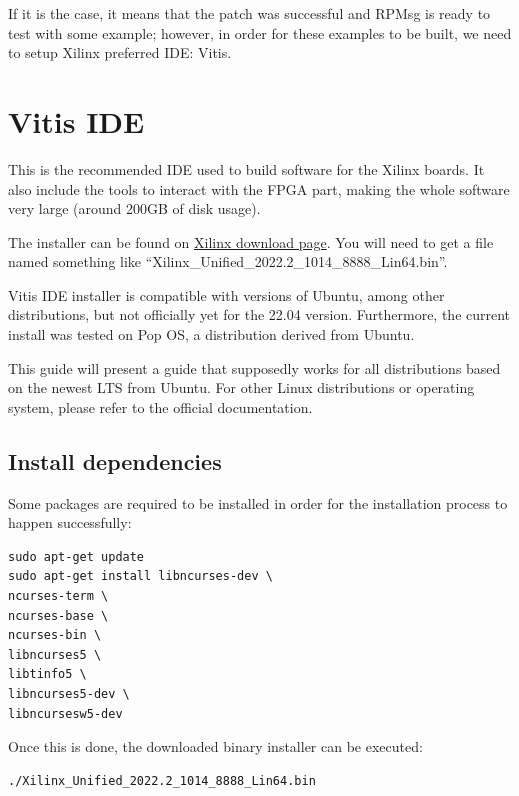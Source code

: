 \documentclass[10pt]{article}
\begin{document}
If it is the case, it means that the patch was successful and RPMsg is
ready to test with some example; however, in order for these examples
to be built, we need to setup Xilinx preferred IDE: Vitis.



\section{Vitis IDE}
\label{sec:vitis-ide}
This is the recommended IDE used to build software for the Xilinx boards.
It also include the tools to interact with the FPGA part, making the whole
software very large (around 200GB of disk usage).

The installer can be found on \href{https://www.xilinx.com/support/download/index.html/content/xilinx/en/downloadNav/vitis.html}{Xilinx download page}. You will need to get
a file named something like ``Xilinx\_Unified\_2022.2\_1014\_8888\_Lin64.bin''.

Vitis IDE installer is compatible with versions of Ubuntu, among other distributions,
but not officially yet for the 22.04 version.
Furthermore, the current install was tested on Pop OS, a distribution derived from Ubuntu.

This guide will present a guide that supposedly works for all distributions based on the newest
LTS from Ubuntu. For other Linux distributions or operating system, please refer to the official documentation.


\subsection{Install dependencies}
\label{sec:install-dependencies}
Some packages are required to be installed in order for the installation process to happen successfully:
\begin{tcolorbox}
\begin{verbatim}
sudo apt-get update
sudo apt-get install libncurses-dev \
ncurses-term \
ncurses-base \
ncurses-bin \
libncurses5 \
libtinfo5 \
libncurses5-dev \
libncursesw5-dev
\end{verbatim}
\end{tcolorbox}

Once this is done, the downloaded binary installer can be executed:
\begin{tcolorbox}
\begin{verbatim}
./Xilinx_Unified_2022.2_1014_8888_Lin64.bin
\end{verbatim}
\end{tcolorbox}
\end{document}
